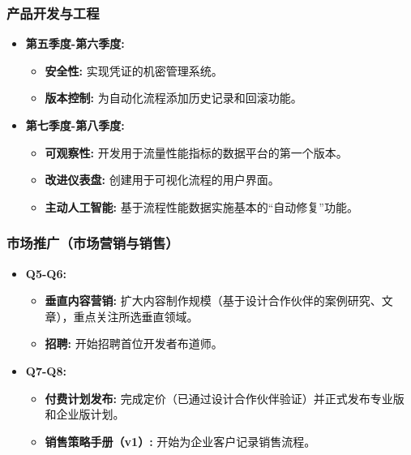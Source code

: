 \documentclass[11点, A4纸, 单面]{article}
\begin{document}
\subsubsection{产品开发与工程}
\begin{itemize}[leftmargin=*]
    \item \textbf{第五季度-第六季度:}
    \begin{itemize}
        \item \textbf{安全性:} 实现凭证的机密管理系统。
        \item \textbf{版本控制:} 为自动化流程添加历史记录和回滚功能。
    \end{itemize}
    \item \textbf{第七季度-第八季度:}
    \begin{itemize}
        \item \textbf{可观察性:} 开发用于流量性能指标的数据平台的第一个版本。
        \item \textbf{改进仪表盘:} 创建用于可视化流程的用户界面。
        \item \textbf{主动人工智能:} 基于流程性能数据实施基本的“自动修复”功能。
    \end{itemize}
\end{itemize}

\subsubsection{市场推广（市场营销与销售）}
\begin{itemize}[leftmargin=*]
    \item \textbf{Q5-Q6:}
    \begin{itemize}
        \item \textbf{垂直内容营销:} 扩大内容制作规模（基于设计合作伙伴的案例研究、文章），重点关注所选垂直领域。
        \item \textbf{招聘:} 开始招聘首位开发者布道师。
    \end{itemize}
    \item \textbf{Q7-Q8:}
    \begin{itemize}
        \item \textbf{付费计划发布:} 完成定价（已通过设计合作伙伴验证）并正式发布专业版和企业版计划。
        \item \textbf{销售策略手册（v1）:} 开始为企业客户记录销售流程。
    \end{itemize}
\end{itemize}

\clearpage

\end{document}
